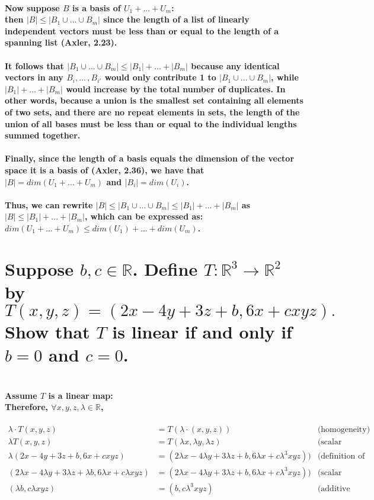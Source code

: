 \documentclass{article}
\begin{document}
\paragraph{\large
Now suppose $B$ is a basis of $U_1+...+U_m$:
\\then $|B| \leq |B_1 \cup ... \cup B_m|$ since the length of a list of linearly independent vectors must be less than or equal to the length of a spanning list (Axler, 2.23).
\\\\
It follows that $|B_1 \cup ... \cup B_m| \leq |B_1|+...+|B_m|$ because any identical vectors in any $B_i,...\,,B_{i'}$ would only contribute 1 to $|B_1 \cup ... \cup B_m|$, while $|B_1|+...+|B_m|$ would increase by the total number of duplicates. In other words, because a union is the smallest set containing all elements of two sets, and there are no repeat elements in sets, the length of the union of all bases must be less than or equal to the individual lengths summed together.
\\\\
Finally, since the length of a basis equals the dimension of the vector space it is a basis of (Axler, 2.36), we have that $|B| = dim(U_1+...+U_m)$ and $|B_i| = dim(U_i)$. 
\\\\
Thus, we can rewrite $|B| \leq |B_1 \cup ... \cup B_m| \leq |B_1|+...+|B_m|$ as $|B| \leq |B_1|+...+|B_m|$, which can be expressed as:
\\ $dim(U_1+...+U_m) \leq dim(U_1)+...+dim(U_m)$.
}

\newpage

\section{Suppose $b,c \in \mathbb{R}$. Define $T : \mathbb{R}^3 \rightarrow \mathbb{R}^2$ by
$$
T(x,y,z) = (2x - 4 y + 3z + b, 6x + cxyz).
$$
Show that $T$ is linear if and only if $b = 0$ and $c = 0$.}

\paragraph{\large
\\Assume $T$ is a linear map:
\\ Therefore, $\forall x,y,z,\lambda \in \mathbb{R}$,}

\begin{align*}
    \lambda \cdot T(x, y, z) &= T(\lambda \cdot (x, y, z)) & \text{(homogeneity)} \\
    \lambda T(x, y, z) &= T(\lambda x, \lambda y, \lambda z) & \text{(scalar multiplication)} \\
    \lambda (2x - 4y + 3z + b, 6x + cxyz) &= (2\lambda x - 4\lambda y + 3\lambda z + b, 6\lambda x + c\lambda^3 xyz)) & \text{(definition of T)}\\
    (2\lambda x - 4\lambda y + 3\lambda z + \lambda b, 6\lambda x + c\lambda xyz) &= (2\lambda x - 4\lambda y + 3\lambda z + b, 6\lambda x + c\lambda^3 xyz)) & \text{(scalar multiplication)}\\
    (\lambda b, c\lambda xyz) &= (b, c\lambda^3xyz) & \text{(additive inverse)}
\end{align*}
\end{document}
